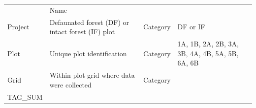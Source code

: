 \documentclass[
  12pt,
]{article}
\begin{document}
\begin{longtable}[]{@{}llll@{}}
\begin{minipage}[t]{0.35\columnwidth}
\end{minipage} & \begin{minipage}[t]{0.18\columnwidth}\raggedright
Name\strut
\end{minipage} & \begin{minipage}[t]{0.18\columnwidth}\raggedright
\strut
\end{minipage}\tabularnewline
\begin{minipage}[t]{0.18\columnwidth}\raggedright
Project\strut
\end{minipage} & \begin{minipage}[t]{0.35\columnwidth}\raggedright
Defaunated forest (DF) or intact forest (IF) plot\strut
\end{minipage} & \begin{minipage}[t]{0.18\columnwidth}\raggedright
Category\strut
\end{minipage} & \begin{minipage}[t]{0.18\columnwidth}\raggedright
DF or IF\strut
\end{minipage}\tabularnewline
\begin{minipage}[t]{0.18\columnwidth}\raggedright
Plot\strut
\end{minipage} & \begin{minipage}[t]{0.35\columnwidth}\raggedright
Unique plot identification\strut
\end{minipage} & \begin{minipage}[t]{0.18\columnwidth}\raggedright
Category\strut
\end{minipage} & \begin{minipage}[t]{0.18\columnwidth}\raggedright
1A, 1B, 2A, 2B, 3A, 3B, 4A, 4B, 5A, 5B, 6A, 6B\strut
\end{minipage}\tabularnewline
\begin{minipage}[t]{0.18\columnwidth}\raggedright
Grid\strut
\end{minipage} & \begin{minipage}[t]{0.35\columnwidth}\raggedright
Within-plot grid where data were collected\strut
\end{minipage} & \begin{minipage}[t]{0.18\columnwidth}\raggedright
Category\strut
\end{minipage} & \begin{minipage}[t]{0.18\columnwidth}\raggedright
\strut
\end{minipage}\tabularnewline
\begin{minipage}[t]{0.18\columnwidth}\raggedright
TAG\_SUM\strut
\end{minipage} & \begin{minipage}[t]{0.35\columnwidth}\raggedright

\end{minipage}
\end{longtable}
\end{document}
